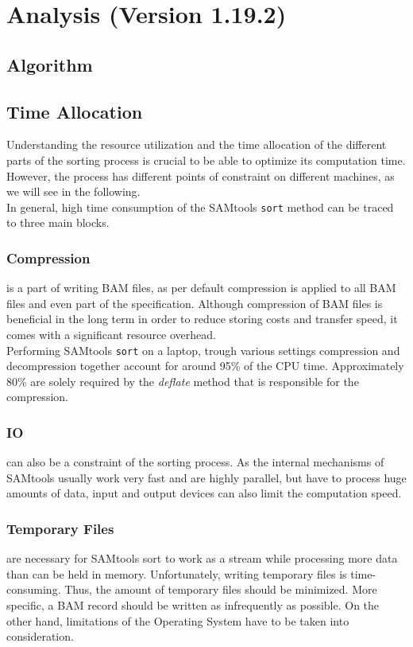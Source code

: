 \section{Analysis (Version 1.19.2)}

\subsection{Algorithm}


\subsection{Time Allocation}
Understanding the resource utilization and the time allocation of the different parts of the sorting process is crucial to be able to optimize its computation time. However, the process has different points of constraint on different machines, as we will see in the following. \\
In general, high time consumption of the SAMtools \texttt{sort} method can be traced to three main blocks.

\subsubsection{Compression} is a part of writing BAM files, as per default compression is applied to all BAM files and even part of the specification. Although compression of BAM files is beneficial in the long term in order to reduce storing costs and transfer speed, it comes with a significant resource overhead. \\
Performing SAMtools \texttt{sort} on a laptop, trough various settings compression and decompression together account for around 95\% of the CPU time. Approximately 80\% are solely required by the \textit{deflate} method that is responsible for the compression.

\subsubsection{IO} can also be a constraint of the sorting process. As the internal mechanisms of SAMtools usually work very fast and are highly parallel, but have to process huge amounts of data, input and output devices can also limit the computation speed.

\subsubsection{Temporary Files} are necessary for SAMtools sort to work as a stream while processing more data than can be held in memory. Unfortunately, writing temporary files is time-consuming. Thus, the amount of temporary files should be minimized. More specific, a BAM record should be written as infrequently as possible. On the other hand, limitations of the Operating System have to be taken into consideration.

